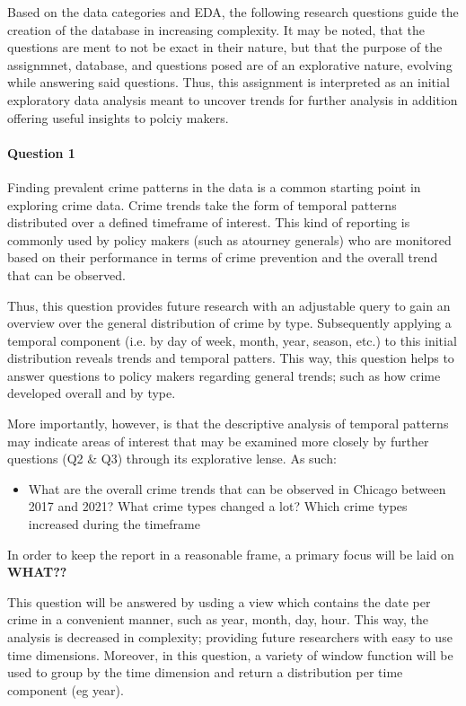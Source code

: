\documentclass[a4paper]{article}
\begin{document}
Based on the data categories and EDA, the following research questions guide the creation of the database in increasing complexity. It may be noted, that the questions are ment to not be exact in their nature, but that the purpose of the assignmnet, database, and questions posed are of an explorative nature, evolving while answering said questions. Thus, this assignment is interpreted as an initial exploratory data analysis meant to uncover trends for further analysis in addition offering useful insights to polciy makers. 

\paragraph{Question 1} Finding prevalent crime patterns in the data is a common starting point in exploring crime data. Crime trends take the form of temporal patterns distributed over a defined timeframe of interest. This kind of reporting is commonly used by policy makers (such as atourney generals) who are monitored based on their performance in terms of crime prevention and the overall trend that can be observed. 

Thus, this question provides future research with an adjustable query to gain an overview over the general distribution of crime by type. Subsequently applying a temporal component (i.e. by day of week,  month, year, season, etc.) to this initial distribution reveals trends and temporal patters. This way, this question helps to answer questions to policy makers regarding general trends; such as how crime developed overall and by type. 

More importantly, however, is that the descriptive analysis of temporal patterns may indicate areas of interest that may be examined more closely by further questions (Q2 \& Q3) through its explorative lense. As such:

\begin{itemize}
  \item What are the overall crime trends that can be observed in Chicago between 2017 and 2021? What crime types changed a lot? Which crime types increased during the timeframe

\end{itemize}

In order to keep the report in a reasonable frame, a primary focus will be laid on \textbf{WHAT??}

This question will be answered by usding a view which contains the date per crime in a convenient manner, such as year, month, day, hour. This way, the analysis is decreased in complexity; providing future researchers with easy to use time dimensions. Moreover, in this question, a variety of window function will be used to group by the time dimension and return a distribution per time component (eg year).
\end{document}
